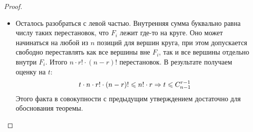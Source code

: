 \begin{proof}
\begin{itemize}
		\item Осталось разобраться с левой частью. Внутренняя сумма буквально равна числу таких перестановок, что $F_i$ лежит где-то на круге. Оно может начинаться на любой из $n$ позиций для вершин круга, при этом допускается свободно переставлять как все вершины вне $F_i$, так и все вершины отдельно внутри $F_i$. Итого $n \cdot r! \cdot (n - r)!$ перестановок. В результате получаем оценку на $t$:
		\[
			t \cdot n \cdot r! \cdot (n - r)! \leqslant n! \cdot r \Rightarrow t \leqslant C_{n - 1}^{r - 1}
		\]
		Этого факта в совокупности с предыдущим утверждением достаточно для обоснования теоремы.
	\end{itemize}
\end{proof}